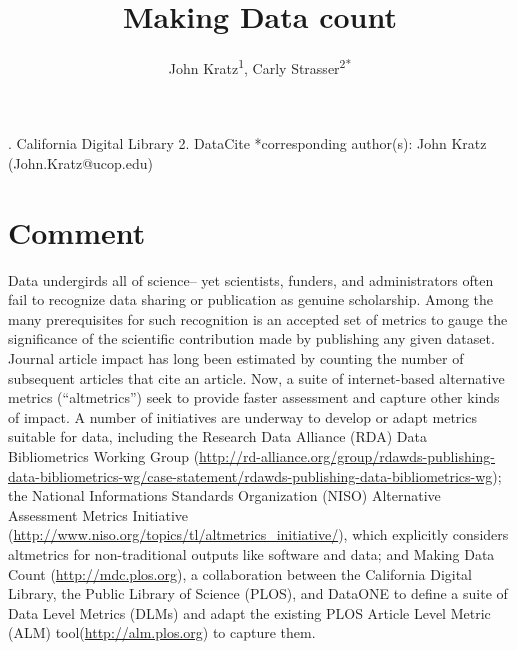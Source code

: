 \documentclass[english]{article}
\begin{document}
\title{Making Data count}


\author{John Kratz\textsuperscript{1}, Carly
Strasser\textsuperscript{2{*}}}

. California Digital Library 2. DataCite {*}corresponding author(s):
John Kratz (John.Kratz@ucop.edu)


\section*{Comment}


Data undergirds all of science-- yet scientists, funders, and administrators often fail to recognize data sharing or publication as genuine scholarship.
Among the many prerequisites for such recognition is an accepted set of metrics to gauge the significance of the scientific contribution made by publishing any given dataset.
Journal article impact has long been estimated by counting the number of subsequent articles that cite an article. 
Now, a suite of internet-based alternative metrics (``altmetrics'') seek to provide faster assessment and capture other kinds of impact.
A number of initiatives are underway to develop or adapt metrics suitable for data, including the Research Data Alliance (RDA) Data Bibliometrics Working Group (\url{http://rd-alliance.org/group/rdawds-publishing-data-bibliometrics-wg/case-statement/rdawds-publishing-data-bibliometrics-wg}{}); the National Informations Standards Organization (NISO) Alternative Assessment Metrics Initiative (\url{http://www.niso.org/topics/tl/altmetrics_initiative/}), which explicitly considers altmetrics for non-traditional outputs like software and data; and Making Data Count (\url{http://mdc.plos.org}), a collaboration between the California Digital Library, the Public Library of Science (PLOS), and DataONE to define a suite of Data Level Metrics (DLMs) and adapt the existing PLOS Article Level Metric (ALM) tool(\url{http://alm.plos.org}) to capture them.

\end{document}
